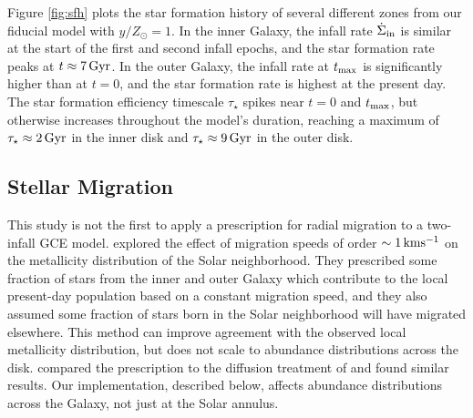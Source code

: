 \documentclass[twocolumn,twocolappendix,linenumbers]{aastex631}
\begin{document}
Figure \ref{fig:sfh} plots the star formation history of several different zones from our fiducial model with $y/Z_\odot=1$. In the inner Galaxy, the infall rate $\dot\Sigma_{\rm in}$ is similar at the start of the first and second infall epochs, and the star formation rate peaks at $t\approx7\,{\rm Gyr}$. In the outer Galaxy, the infall rate at $t_{\rm max}$ is significantly higher than at $t=0$, and the star formation rate is highest at the present day. The star formation efficiency timescale $\tau_\star$ spikes near $t=0$ and $t_{\rm max}$, but otherwise increases throughout the model's duration, reaching a maximum of $\tau_\star\approx2\,{\rm Gyr}$ in the inner disk and $\tau_\star\approx 9\,{\rm Gyr}$ in the outer disk.

\subsection{Stellar Migration}
\label{sec:migration}

This study is not the first to apply a prescription for radial migration to a two-infall GCE model. \citet{spitoni_effect_2015} explored the effect of migration speeds of order $\sim1\,{\rm km}{\rm s}^{-1}$ on the metallicity distribution of the Solar neighborhood. They prescribed some fraction of stars from the inner and outer Galaxy which contribute to the local present-day population based on a constant migration speed, and they also assumed some fraction of stars born in the Solar neighborhood will have migrated elsewhere. This method can improve agreement with the observed local metallicity distribution, but does not scale to abundance distributions across the disk. \citet{palla_mgfe_2022} compared the \citet{spitoni_effect_2015} prescription to the diffusion treatment of \citet{frankel_measuring_2018} and found similar results. Our implementation, described below, affects abundance distributions across the Galaxy, not just at the Solar annulus.

\end{document}
